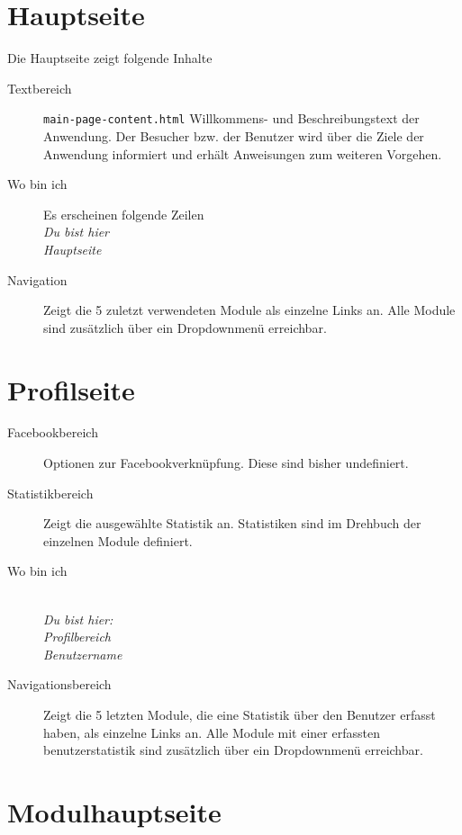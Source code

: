 %
%
%
\section{Hauptseite}
\label{sec:main-page}

Die Hauptseite zeigt folgende Inhalte
\begin{description}
  \item[Textbereich] \texttt{main-page-content.html} Willkommens- und Beschreibungstext der Anwendung. Der Besucher bzw. der Benutzer wird über die Ziele der Anwendung informiert und erhält Anweisungen zum weiteren Vorgehen.
  \item[Wo bin ich] Es erscheinen folgende Zeilen \emph{\\Du bist hier \\Hauptseite}
  \item[Navigation] Zeigt die 5 zuletzt verwendeten Module als einzelne Links an. Alle Module sind zusätzlich über ein Dropdownmenü erreichbar.
	
\end{description}




%
%
%
\section{Profilseite}
\label{sec:profile-page}

\begin{description}
  \item[Facebookbereich] Optionen zur Facebookverknüpfung. Diese sind bisher undefiniert.
  \item[Statistikbereich] Zeigt die ausgewählte Statistik an. Statistiken sind im Drehbuch der einzelnen Module definiert.
  \item[Wo bin ich] \emph{\\Du bist hier:\\Profilbereich\\Benutzername}
  \item[Navigationsbereich] Zeigt die 5 letzten Module, die eine Statistik über den Benutzer erfasst haben, als einzelne 	Links an. Alle Module mit einer erfassten benutzerstatistik sind zusätzlich über ein Dropdownmenü 	erreichbar.
\end{description}




%
%
%
\section{Modulhauptseite}
\label{sec:module-main-page}

